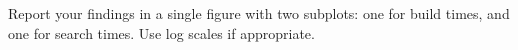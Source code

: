 \begin{problem}
Report your findings in a single figure with two subplots: one for build times, and one for search times.
Use log scales if appropriate.

\end{problem}

